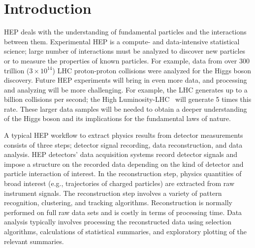 \section{Introduction}
\label{sec:intro}
\squeezeup
HEP deals with the understanding of fundamental particles and the interactions between them.
Experimental HEP is a compute- and data-intensive statistical science; large number of interactions 
must be analyzed to discover new particles or to measure the properties of known particles. 
For example, data from over $300$ trillion ($3\times10^{14}$) LHC proton-proton collisions were analyzed for the Higgs boson discovery.
Future HEP experiments will bring in even more data, and processing and 
analyzing will be more challenging. For example, the LHC generates up to a billion collisions per second; the High Luminosity-LHC~\cite{hllhc} will generate 5 times this rate. These larger data samples will be needed to obtain a 
deeper understanding of the Higgs boson and its implications for the fundamental laws of nature. 
 
A typical HEP workflow to extract physics results from detector measurements consists 
of three steps; 
detector signal recording, data reconstruction, and data analysis. 
HEP detectors' data acquisition systems record detector signals and impose 
 a structure on the recorded data depending on the kind of detector and particle 
 interaction of interest. In the reconstruction step, physics quantities of broad interest 
(e.g., trajectories of charged particles) are extracted from raw instrument signals. 
The reconstruction step involves a variety of pattern recognition, clustering, and tracking algorithms. 
Reconstruction is normally performed on full raw data sets and is costly in terms of processing time.
Data analysis typically involves processing the reconstructed data using 
selection algorithms, calculations of statistical summaries, and exploratory plotting of the relevant summaries. 


